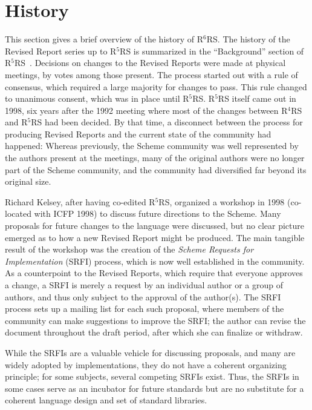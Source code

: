 \documentclass{sigplanconf}
\newcommand{\rn}[1]{R$^{#1}$RS}
\begin{document}
\section{History}
\label{sec:history}

This section gives a brief overview of the history of \rn{6}.  The
history of the Revised Report series up to \rn{5} is summarized in the
``Background'' section of \rn{5}~\cite{R5RS}.  Decisions on changes to
the Revised Reports were made at physical meetings, by votes among
those present.  The process started out with a rule of consensus, which
required a large majority for changes to pass.  This rule changed to
unanimous consent, which was in place until \rn{5}.  \rn{5} itself
came out in 1998, six years after the 1992 meeting where most of the
changes between \rn{4} and \rn{5} had been decided.  By that time, a
disconnect between the process for producing Revised Reports and the
current state of the community had happened: Whereas previously, the
Scheme community was well represented by the authors present at the
meetings, many of the original authors were no longer part of the
Scheme community, and the community had diversified far beyond its
original size.

Richard Kelsey, after having co-edited \rn{5}, organized a workshop in
1998 (co-located with ICFP 1998) to discuss future directions to the
Scheme.  Many proposals for future changes to the language were
discussed, but no clear picture emerged as to how a new Revised Report
might be produced. The main tangible result of the workshop was the
creation of the \textit{Scheme Requests for Implementation} (SRFI)
process, which is now well established in the community.  As a
counterpoint to the Revised Reports, which require that everyone
approves a change, a SRFI is merely a request by an individual author
or a group of authors, and thus only subject to the approval of the
author(s).  The SRFI process sets up a mailing list for each such
proposal, where members of the community can make suggestions to
improve the SRFI; the author can revise the document throughout the
draft period, after which she can finalize or withdraw.

While the SRFIs are a valuable vehicle for discussing proposals, and
many are widely adopted by implementations, they do not have a
coherent organizing principle; for some subjects, several competing
SRFIs exist.  Thus, the SRFIs in some cases serve as an incubator for
future standards but are no substitute for a coherent
language design and set of standard libraries.
\end{document}
